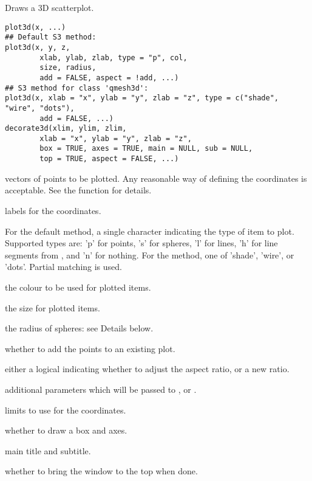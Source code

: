 \begin{Description}\relax
Draws a 3D scatterplot.
\end{Description}
\begin{Usage}
\begin{verbatim}
plot3d(x, ...)
## Default S3 method:
plot3d(x, y, z,  
        xlab, ylab, zlab, type = "p", col,  
        size, radius,
        add = FALSE, aspect = !add, ...)
## S3 method for class 'qmesh3d':
plot3d(x, xlab = "x", ylab = "y", zlab = "z", type = c("shade", "wire", "dots"),
        add = FALSE, ...)       
decorate3d(xlim, ylim, zlim, 
        xlab = "x", ylab = "y", zlab = "z", 
        box = TRUE, axes = TRUE, main = NULL, sub = NULL,
        top = TRUE, aspect = FALSE, ...)
\end{verbatim}
\end{Usage}
\begin{Arguments}
\begin{ldescription}
\item[\code{x, y, z}] vectors of points to be plotted. Any reasonable way of defining the
coordinates is acceptable.  See the function 
for details.
\item[\code{xlab, ylab, zlab}] labels for the coordinates.
\item[\code{type}] For the default method, a single character indicating the type of item to plot.  
Supported types are: 'p' for points, 's' for spheres, 
'l' for lines, 'h' for line segments 
from , and 'n' for nothing.  For the  method, one of 
'shade', 'wire', or 'dots'.  Partial matching is used.

\item[\code{col}] the colour to be used for plotted items.
\item[\code{size}] the size for plotted items.
\item[\code{radius}] the radius of spheres:  see Details below.
\item[\code{add}] whether to add the points to an existing plot.
\item[\code{aspect}] either a logical indicating whether to adjust the aspect ratio, or a new ratio.
\item[\code{...}] additional parameters which will be passed to , 
or .
\item[\code{xlim, ylim, zlim}] limits to use for the coordinates.
\item[\code{box, axes}] whether to draw a box and axes.
\item[\code{main, sub}] main title and subtitle.
\item[\code{top}] whether to bring the window to the top when done.
\end{ldescription}
\end{Arguments}
